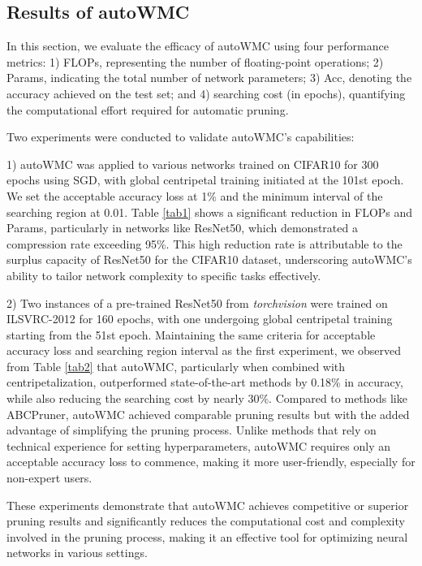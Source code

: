 \documentclass[sigconf, 10pt]{acmart}
\begin{document}
\subsection{Results of autoWMC}

In this section, we evaluate the efficacy of autoWMC using four performance metrics: 1) FLOPs, representing the number of floating-point operations; 2) Params, indicating the total number of network parameters; 3) Acc, denoting the accuracy achieved on the test set; and 4) searching cost (in epochs), quantifying the computational effort required for automatic pruning.

Two experiments were conducted to validate autoWMC's capabilities:

1) autoWMC was applied to various networks trained on CIFAR10 for 300 epochs using SGD, with global centripetal training initiated at the 101st epoch. We set the acceptable accuracy loss at 1\% and the minimum interval of the searching region at 0.01. Table \ref{tab1} shows a significant reduction in FLOPs and Params, particularly in networks like ResNet50, which demonstrated a compression rate exceeding 95\%. This high reduction rate is attributable to the surplus capacity of ResNet50 for the CIFAR10 dataset, underscoring autoWMC's ability to tailor network complexity to specific tasks effectively.

2) Two instances of a pre-trained ResNet50 from \textit{torchvision} were trained on ILSVRC-2012 for 160 epochs, with one undergoing global centripetal training starting from the 51st epoch. Maintaining the same criteria for acceptable accuracy loss and searching region interval as the first experiment, we observed from Table \ref{tab2} that autoWMC, particularly when combined with centripetalization, outperformed state-of-the-art methods by 0.18\% in accuracy, while also reducing the searching cost by nearly 30\%. Compared to methods like ABCPruner\cite{lin2021channel}, autoWMC achieved comparable pruning results but with the added advantage of simplifying the pruning process. Unlike methods that rely on technical experience for setting hyperparameters, autoWMC requires only an acceptable accuracy loss to commence, making it more user-friendly, especially for non-expert users.

These experiments demonstrate that autoWMC achieves competitive or superior pruning results and significantly reduces the computational cost and complexity involved in the pruning process, making it an effective tool for optimizing neural networks in various settings.
\end{document}
